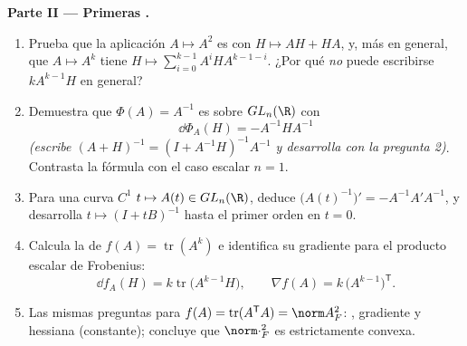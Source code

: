\begin{problem}
\medskip
\noindent\textbf{Parte II --- Primeras .}
\begin{enumerate}[resume]
  \item Prueba que la aplicación $A \mapsto A^2$ es  con
         $H \mapsto AH + HA$, y, más en general, que $A
        \mapsto A^k$ tiene  $H \mapsto \sum_{i=0}^{k-1}
        A^iHA^{k-1-i}$. ¿Por qué \emph{no} puede escribirse $kA^{k-1}
        H$ en general?
  \item Demuestra que $\Phi(A) = A^{-1}$ es  sobre
        $GL_n(\R)$ con
        \[
        \dd\Phi_A(H) = -A^{-1}HA^{-1}
        \]
        \emph{(escribe $(A + H)^{-1} = (I + A^{-1}H)^{-1}A^{-1}$ y
        desarrolla con la pregunta 2)}. Contrasta la fórmula con el
        caso escalar $n = 1$.
  \item Para una curva $C^1$ $t \mapsto A(t) \in GL_n(\R)$, deduce
        $\bigl(A(t)^{-1}\bigr)' = -A^{-1}A'A^{-1}$, y desarrolla $t
        \mapsto (I + tB)^{-1}$ hasta el primer orden en $t = 0$.
  \item Calcula la  de $f(A) = \operatorname{tr}(A^k)$ e
        identifica su gradiente para el producto escalar de
        Frobenius:
        \[
        \dd f_A(H) = k\operatorname{tr}\bigl(A^{k-1}H\bigr),
        \qquad
        \nabla f(A) = k\,\bigl(A^{k-1}\bigr)^{\mathsf T} .
        \]
  \item Las mismas preguntas para $f(A) = \operatorname{tr}
        (A^{\mathsf T}A) = \norm A_F^2$: , gradiente y
        hessiana (constante); concluye que $\norm\cdot_F^2$ es
        estrictamente convexa.
\end{enumerate}


\end{problem}
